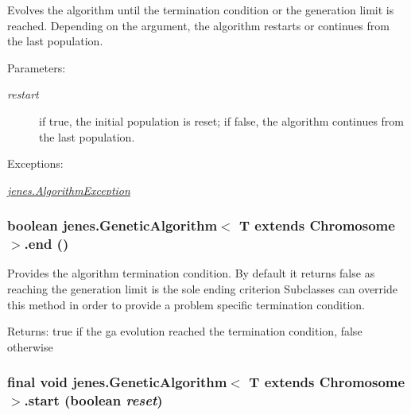 Evolves the algorithm until the termination condition or the generation limit is reached. Depending on the argument, the algorithm restarts or continues from the last population.

\begin{Desc}
\item[Parameters:]
\begin{description}
\item[{\em restart}]if true, the initial population is reset; if false, the algorithm continues from the last population.\end{description}
\end{Desc}
\begin{Desc}
\item[Exceptions:]
\begin{description}
\item[{\em \hyperlink{classjenes_1_1_algorithm_exception}{jenes.AlgorithmException}}]\end{description}
\end{Desc}
\hypertarget{classjenes_1_1_genetic_algorithm_3_01_t_01extends_01_chromosome_01_4_41376d72c82d4503693eebb3832cf772}{
\subsubsection[end]{\setlength{\rightskip}{0pt plus 5cm}boolean jenes.GeneticAlgorithm$<$ T extends Chromosome $>$.end ()}}
\label{classjenes_1_1_genetic_algorithm_3_01_t_01extends_01_chromosome_01_4_41376d72c82d4503693eebb3832cf772}


Provides the algorithm termination condition. By default it returns false as reaching the generation limit is the sole ending criterion Subclasses can override this method in order to provide a problem specific termination condition. 

\begin{Desc}
\item[Returns:]true if the ga evolution reached the termination condition, false otherwise \end{Desc}
\hypertarget{classjenes_1_1_genetic_algorithm_3_01_t_01extends_01_chromosome_01_4_6fd4badfc67b0c2b0d43c6dd4a14875e}{
\subsubsection[start]{\setlength{\rightskip}{0pt plus 5cm}final void jenes.GeneticAlgorithm$<$ T extends Chromosome $>$.start (boolean {\em reset})}}
\label{classjenes_1_1_genetic_algorithm_3_01_t_01extends_01_chromosome_01_4_6fd4badfc67b0c2b0d43c6dd4a14875e}



